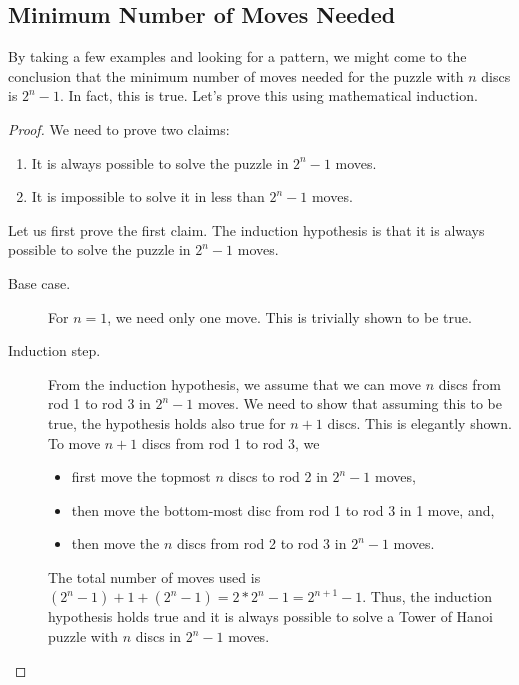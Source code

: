 \documentclass[12pt, a4paper]{article}
\theoremstyle{definition}
\theoremstyle{remark}
\begin{document}
\subsection{Minimum Number of Moves Needed}
By taking a few examples and looking for a pattern, we might come to the conclusion that the minimum number of moves needed for the puzzle with $n$ discs is $2^n - 1$. In fact, this is true. Let's prove this using mathematical induction.
\begin{proof}
    We need to prove two claims:
    \begin{enumerate}
        \item It is always possible to solve the puzzle in $2^n-1$ moves.
        \item It is impossible to solve it in less than $2^n-1$ moves.
    \end{enumerate}

    Let us first prove the first claim. The induction hypothesis is that it is always possible to solve the puzzle in $2^n-1$ moves.
    \begin{description}
        \item[Base case.] For $n=1$, we need only one move. This is trivially shown to be true.
        \item[Induction step.] From the induction hypothesis, we assume that we can move $n$ discs from rod 1 to rod 3 in $2^n - 1$ moves. We need to show that assuming this to be true, the hypothesis holds also true for $n+1$ discs. This is elegantly shown. To move $n+1$ discs from rod 1 to rod 3, we
            \begin{itemize}
                \item first move the topmost $n$ discs to rod 2 in $2^n-1$ moves,
                \item then move the bottom-most disc from rod 1 to rod 3 in 1 move, and,
                \item then move the $n$ discs from rod 2 to rod 3 in $2^n-1$ moves.
            \end{itemize}
            The total number of moves used is $(2^n - 1) + 1 + (2^n - 1) = 2 * 2^n - 1 = 2^{n+1} - 1$.
            Thus, the induction hypothesis holds true and it is always possible to solve a Tower of Hanoi puzzle with $n$ discs in $2^n-1$ moves.
    \end{description}


\end{proof}
\end{document}
